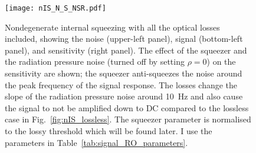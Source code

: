 \begin{figure}
	\centering
	\texttt{[image: nIS\_N\_S\_NSR.pdf]}
	\caption{Nondegenerate internal squeezing with all the optical losses included, showing the noise (upper-left panel), signal (bottom-left panel), and sensitivity (right panel). The effect of the squeezer and the radiation pressure noise (turned off by setting $\rho=0$) on the sensitivity are shown; the squeezer anti-squeezes the noise around the peak frequency of the signal response. The losses change the slope of the radiation pressure noise around 10~Hz and also cause the signal to not be amplified down to DC compared to the lossless case in Fig.~\ref{fig:nIS_lossless}. The squeezer parameter is normalised to the lossy threshold which will be found later. I use the parameters in Table~\ref{tab:signal_RO_parameters}.}
	\label{fig:nIS_general_sens}
\end{figure}

